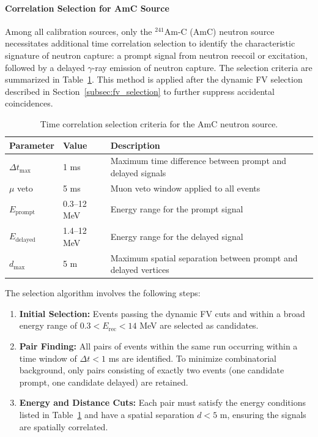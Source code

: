 \paragraph{Correlation Selection for AmC Source}
\label{subsec:amc_selection}

Among all calibration sources, only the $^{241}\mathrm{Am}$-C (AmC) neutron source necessitates additional time correlation selection to identify the characteristic signature of neutron capture: a prompt signal from neutron reecoil or excitation, followed by a delayed $\gamma$-ray emission of neutron capture. The selection criteria are summarized in Table~\ref{tab:amc_cuts}. This method is applied after the dynamic FV selection described in Section~\ref{subsec:fv_selection} to further suppress accidental coincidences.

\begin{table}[h!]
\centering
\caption{Time correlation selection criteria for the AmC neutron source.}
\label{tab:amc_cuts}
\begin{tabular}{lll}
\toprule
\textbf{Parameter} & \textbf{Value} & \textbf{Description} \\
\midrule
$\Delta t_{\mathrm{max}}$ & 1 ms & Maximum time difference between prompt and delayed signals \\
$\mu$ veto & 5 ms & Muon veto window applied to all events \\
$E_{\mathrm{prompt}}$ & 0.3--12 MeV & Energy range for the prompt signal \\
$E_{\mathrm{delayed}}$ & 1.4--12 MeV & Energy range for the delayed signal \\
$d_{\mathrm{max}}$ & 5 m & Maximum spatial separation between prompt and delayed vertices \\
\bottomrule
\end{tabular}
\end{table}

The selection algorithm involves the following steps:

\begin{enumerate}
    \item \textbf{Initial Selection:} Events passing the dynamic FV cuts and within a broad energy range of $0.3 < E_{\mathrm{rec}} < 14$ MeV are selected as candidates.
    \item \textbf{Pair Finding:} All pairs of events within the same run occurring within a time window of $\Delta t < 1$ ms are identified. To minimize combinatorial background, only pairs consisting of exactly two events (one candidate prompt, one candidate delayed) are retained.
    \item \textbf{Energy and Distance Cuts:} Each pair must satisfy the energy conditions listed in Table~\ref{tab:amc_cuts} and have a spatial separation $d < 5$ m, ensuring the signals are spatially correlated.
\end{enumerate}

